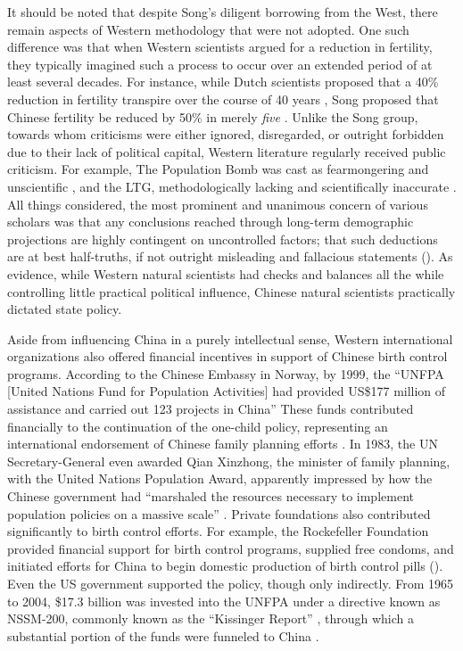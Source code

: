 It should be noted that despite Song’s diligent borrowing from the West, there remain aspects of Western methodology that were not adopted. One such difference was that when Western scientists argued for a reduction in fertility, they typically imagined such a process to occur over an extended period of at least several decades. For instance, while Dutch scientists proposed that a 40\% reduction in fertility transpire over the course of 40 years \autocite[p.\ 365]{Kwakernaak1977}, Song proposed that Chinese fertility be reduced by 50\% in merely \emph{five} \autocite[p.\ 163]{Greenhalgh2008JustOneChild}. Unlike the Song group, towards whom criticisms were either ignored, disregarded, or outright forbidden due to their lack of political capital, Western literature regularly received public criticism. For example, The Population Bomb was cast as fearmongering and unscientific \autocite[pp.\ 66--70]{Revelle1971}, and the LTG, methodologically lacking and scientifically inaccurate \autocite[pp.\ 1182--1183]{Nordhaus1973}. All things considered, the most prominent and unanimous concern of various scholars was that any conclusions reached through long-term demographic projections are highly contingent on uncontrolled factors; that such deductions are at best half-truths, if not outright misleading and fallacious statements (\cites[p.\ 1183]{Nordhaus1973}[p.\ 52]{Sanderson1994SimulationModels}[p.\ 133]{ColeEtAl1973}). As evidence, while Western natural scientists had checks and balances all the while controlling little practical political influence, Chinese natural scientists practically dictated state policy.

Aside from influencing China in a purely intellectual sense, Western international organizations also offered financial incentives in support of Chinese birth control programs. According to the Chinese Embassy in Norway, by 1999, the “UNFPA [United Nations Fund for Population Activities] had provided US\$177 million of assistance and carried out 123 projects in China” \autocite[pp.\ 953--954]{WangEtAl2016AJS} These funds contributed financially to the continuation of the one-child policy, representing an international endorsement of Chinese family planning efforts \autocite[p.\ 102]{YiFuxian2013}. In 1983, the UN Secretary-General even awarded Qian Xinzhong, the minister of family planning, with the United Nations Population Award, apparently impressed by how the Chinese government had “marshaled the resources necessary to implement population policies on a massive scale” \autocite{PDR1983UNPopAward}. Private foundations also contributed significantly to birth control efforts. For example, the Rockefeller Foundation provided financial support for birth control programs, supplied free condoms, and initiated efforts for China to begin domestic production of birth control pills (\cites[p.\ 119]{Chung2002}[p.\ 954]{WangEtAl2016AJS}). Even the US government supported the policy, though only indirectly. From 1965 to 2004, \$17.3 billion was invested into the UNFPA under a directive known as NSSM-200, commonly known as the “Kissinger Report” \autocite[p.\ 27]{Clowes2004KissingerReport}, through which a substantial portion of the funds were funneled to China \autocite[p.\ 956]{WangEtAl2016AJS}. 

